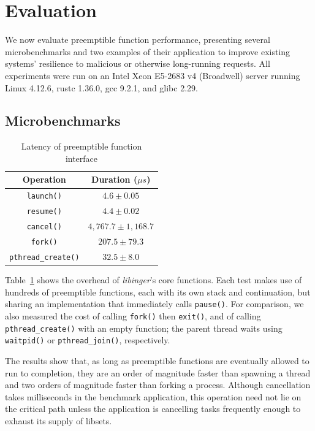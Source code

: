 \section{Evaluation}
\label{sec:eval}

We now evaluate preemptible function performance, presenting several
microbenchmarks and two examples of their application to improve
existing systems' resilience to malicious or otherwise long-running
requests.  All experiments were run on an Intel Xeon E5-2683 v4 (Broadwell)
server running Linux 4.12.6, rustc 1.36.0, gcc 9.2.1, and glibc 2.29.



\subsection{Microbenchmarks}

\begin{table}
\begin{center}
\begin{tabular}{c | c}
Operation & Duration ($\mu{s}$) \\
\hline
\texttt{launch()} & $4.6 \pm 0.05$ \\
\texttt{resume()} & $4.4 \pm 0.02$ \\
\texttt{cancel()} & $4,767.7 \pm 1,168.7$ \\
\hline
\texttt{fork()} & $207.5 \pm 79.3$ \\
\texttt{pthread\_create()} & $32.5 \pm 8.0$
\end{tabular}
\end{center}
\caption{Latency of preemptible function interface}
\label{tab:libinger}
\end{table}

Table~\ref{tab:libinger} shows the overhead of \textit{libinger}'s core functions.
Each test makes use of hundreds of preemptible functions, each with its own stack and
continuation, but sharing an implementation that immediately calls \texttt{pause()}.
For comparison, we also measured the cost of calling \texttt{fork()} then
\texttt{exit()}, and of calling \texttt{pthread\_create()} with an empty function;
the parent
thread waits using \texttt{waitpid()} or \texttt{pthread\_join()}, respectively.

The results show that, as long as preemptible functions are eventually allowed to run
to completion, they are an order of magnitude faster than spawning a thread and two
orders of magnitude faster than forking a process.  Although cancellation takes
milliseconds in the benchmark application, this operation need not lie on the
critical path unless the application is cancelling tasks frequently enough to exhaust
its supply of libsets.

